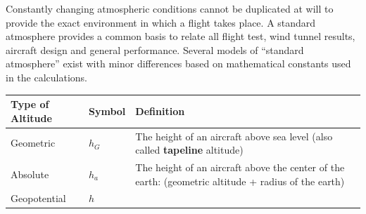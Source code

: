 \documentclass[
]{book}
\begin{document}
Constantly changing atmospheric conditions cannot be duplicated at will to provide the exact environment in which a flight takes place. A standard atmosphere provides a common basis to relate all flight test, wind tunnel results, aircraft design and general performance. Several models of ``standard atmosphere'' exist with minor differences based on mathematical constants used in the calculations.

\begin{longtable}[]{@{}lll@{}}
\toprule
\begin{minipage}[b]{0.07\columnwidth}\raggedright
Type of Altitude\strut
\end{minipage} & \begin{minipage}[b]{0.03\columnwidth}\raggedright
Symbol\strut
\end{minipage} & \begin{minipage}[b]{0.81\columnwidth}\raggedright
Definition\strut
\end{minipage}\tabularnewline
\midrule
\endhead
\begin{minipage}[t]{0.07\columnwidth}\raggedright
Geometric\strut
\end{minipage} & \begin{minipage}[t]{0.03\columnwidth}\raggedright
\(h_G\)\strut
\end{minipage} & \begin{minipage}[t]{0.81\columnwidth}\raggedright
The height of an aircraft above sea level (also called \textbf{tapeline} altitude)\strut
\end{minipage}\tabularnewline
\begin{minipage}[t]{0.07\columnwidth}\raggedright
Absolute\strut
\end{minipage} & \begin{minipage}[t]{0.03\columnwidth}\raggedright
\(h_a\)\strut
\end{minipage} & \begin{minipage}[t]{0.81\columnwidth}\raggedright
The height of an aircraft above the center of the earth: (geometric altitude + radius of the earth)\strut
\end{minipage}\tabularnewline
\begin{minipage}[t]{0.07\columnwidth}\raggedright
Geopotential\strut
\end{minipage} & \begin{minipage}[t]{0.03\columnwidth}\raggedright
\(h\)\strut
\end{minipage} & \begin{minipage}[t]{0.81\columnwidth}\raggedright

\end{minipage}
\end{longtable}
\end{document}
